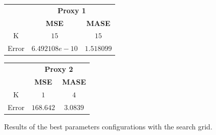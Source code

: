 \begin{figure}[!h]
\centering
\begin{minipage}{\textwidth}
\begin{minipage}{0.5\textwidth}
\begin{center}
\vskip10pt
   \begin{footnotesize}
   \begin{tabular}{|c|c|c|}
   \hline
   & \multicolumn{2}{|c|}{\textbf{Proxy 1}} \\ \cline{2-3}
   & \textbf{MSE} & \textbf{MASE}          \\ \hline
   K  & $15$    & $15$          \\ 
   Error & $6.492108e-10$ & $1.518099$     \\ 
   \hline
   \end{tabular}
   \end{footnotesize}
\end{center}
\end{minipage}
\begin{minipage}{0.5\textwidth}
\begin{center}
\vskip12pt
   \begin{footnotesize}
   \begin{tabular}{|c|c|c|}
   \hline
   & \multicolumn{2}{|c|}{\textbf{Proxy 2}} \\ \cline{2-3}
   & \textbf{MSE} & \textbf{MASE}          \\ \hline
   K  & $1$          & $4$          \\ 
   Error & $168.642$ & $3.0839$     \\ 
   \hline
   \end{tabular}
   \end{footnotesize}
\end{center}
\end{minipage}
\end{minipage}
\caption{Results of the best parameters configurations with the search grid.}
\label{fig:table6mKnn}
\end{figure}
